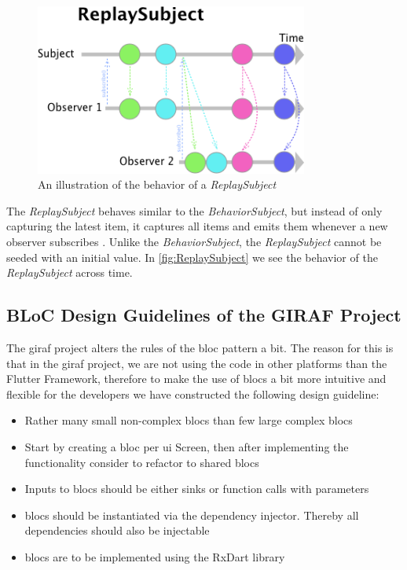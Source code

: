 \begin{figure}[h]
    \centering
    \includegraphics[width=0.8\textwidth]{figures/ReplaySubject.png}
    \caption{An illustration of the behavior of a \textit{ReplaySubject}}
    \label{fig:ReplaySubject}
\end{figure}

The \textit{ReplaySubject} behaves similar to the \textit{BehaviorSubject}, but instead of only capturing the latest item, it captures all items and emits them whenever a new observer subscribes \cite{ReplaySubject}. Unlike the \textit{BehaviorSubject}, the \textit{ReplaySubject} cannot be seeded with an initial value. In \autoref{fig:ReplaySubject} we see the behavior of the \textit{ReplaySubject} across  time.

\subsection{BLoC Design Guidelines of the GIRAF Project}

The \gls{giraf} project alters the rules of the \gls{bloc} pattern a bit. The reason for this is that in the \gls{giraf} project, we are not using the code in other platforms than the Flutter Framework, therefore to make the use of \glspl{bloc} a bit more intuitive and flexible for the developers we have constructed the following design guideline:

\begin{itemize}
  \item Rather many small non-complex \glspl{bloc} than few large complex \glspl{bloc}
  \item Start by creating a \gls{bloc} per \gls{ui} Screen, then after implementing the functionality consider to refactor to shared \glspl{bloc}
  \item Inputs to \glspl{bloc} should be either sinks or function calls with parameters
  \item \glspl{bloc} should be instantiated via the dependency injector. Thereby all dependencies should also be injectable
  \item \glspl{bloc} are to be implemented using the RxDart library
\end{itemize}


